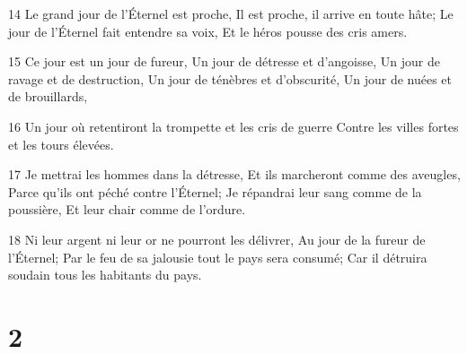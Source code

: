 \par 14 Le grand jour de l'Éternel est proche, Il est proche, il arrive en toute hâte; Le jour de l'Éternel fait entendre sa voix, Et le héros pousse des cris amers.
\par 15 Ce jour est un jour de fureur, Un jour de détresse et d'angoisse, Un jour de ravage et de destruction, Un jour de ténèbres et d'obscurité, Un jour de nuées et de brouillards,
\par 16 Un jour où retentiront la trompette et les cris de guerre Contre les villes fortes et les tours élevées.
\par 17 Je mettrai les hommes dans la détresse, Et ils marcheront comme des aveugles, Parce qu'ils ont péché contre l'Éternel; Je répandrai leur sang comme de la poussière, Et leur chair comme de l'ordure.
\par 18 Ni leur argent ni leur or ne pourront les délivrer, Au jour de la fureur de l'Éternel; Par le feu de sa jalousie tout le pays sera consumé; Car il détruira soudain tous les habitants du pays.

\chapter{2}

